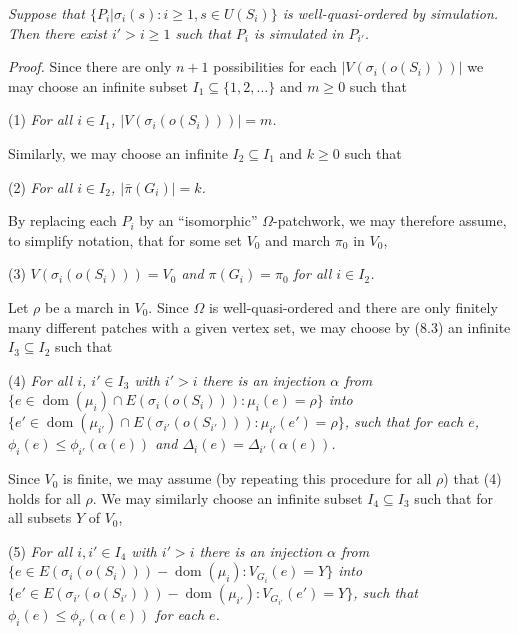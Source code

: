 \textit{Suppose that $\{P_i | \sigma_i(s) \colon i \ge 1, s \in U(S_i)\}$ is well-quasi-ordered by simulation. Then there exist $i' > i \ge 1$ such that $P_i$ is simulated in $P_{i'}$.}

\textit{Proof.} Since there are only $n + 1$ possibilities for each $|V(\sigma_i(o(S_i)))|$ we may choose an infinite subset $I_1 \subseteq \{1, 2, \dots\}$ and $m \ge 0$ such that

\hspace*{12pt}(1) \textit{For all $i \in I_1$, $|V(\sigma_i(o(S_i)))| = m$.}

Similarly, we may choose an infinite $I_2 \subseteq I_1$ and $k \ge 0$ such that

\hspace*{12pt}(2) \textit{For all $i \in I_2$, $|\bar{\pi}(G_i)| = k$.}

By replacing each $P_i$ by an ``isomorphic'' $\Omega$-patchwork, we may therefore assume, to simplify notation, that for some set $V_0$ and march $\pi_0$ in $V_0$,

\hspace*{12pt}(3) \textit{$V(\sigma_i(o(S_i))) = V_0$ and $\pi(G_i) = \pi_0$ for all $i \in I_2$.}

Let $\rho$ be a march in $V_0$. Since $\Omega$ is well-quasi-ordered and there are only finitely many different patches with a given vertex set, we may choose by (8.3) an infinite $I_3 \subseteq I_2$ such that

\hspace*{12pt}(4) \textit{For all $i$, $i' \in I_3$ with $i' > i$ there is an injection $\alpha$ from $\{e \in \operatorname{dom}(\mu_i) \cap E(\sigma_i(o(S_i))) \colon \mu_i(e) = \rho\}$ into $\{e' \in \operatorname{dom}(\mu_{i'}) \cap E(\sigma_{i'}(o(S_{i'}))) \colon \mu_{i'}(e') = \rho\}$, such that for each $e$, $\phi_i(e) \le \phi_{i'}(\alpha(e))$ and $\Delta_i(e) = \Delta_{i'}(\alpha(e))$.}

Since $V_0$ is finite, we may assume (by repeating this procedure for all $\rho$) that (4) holds for all $\rho$. We may similarly choose an infinite subset $I_4 \subseteq I_3$ such that for all subsets $Y$ of $V_0$,

\hspace*{12pt}(5) \textit{For all $i, i' \in I_4$ with $i' > i$ there is an injection $\alpha$ from $\{e \in E(\sigma_i(o(S_i))) - \operatorname{dom}(\mu_i) \colon V_{G_i}(e) = Y\}$ into $\{e' \in E(\sigma_{i'}(o(S_{i'}))) - \operatorname{dom}(\mu_{i'}) \colon V_{G_{i'}}(e') = Y\}$, such that $\phi_i(e) \le \phi_{i'}(\alpha(e))$ for each $e$.}

